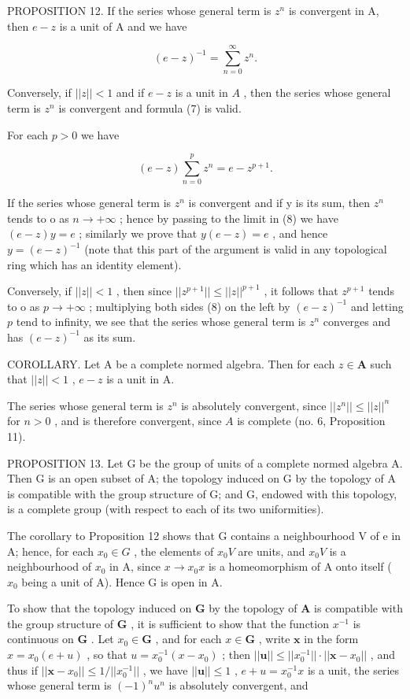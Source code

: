 PROPOSITION 12. If the series whose general term is \(z^n\) is convergent in A, then \(e - z\) is a unit of A and we have

\[
(e - z) ^ {- 1} = \sum_ {n = 0} ^ {\infty} z ^ {n}.\tag{7}
\]

Conversely, if \(||z|| < 1\) and if \(e - z\) is a unit in \(A\) , then the series whose general term is \(z^n\) is convergent and formula (7) is valid.

For each \(p > 0\) we have

\[
(e - z) \sum_ {n = 0} ^ {p} z ^ {n} = e - z ^ {p + 1}.\tag{8}
\]

If the series whose general term is \(z^{n}\) is convergent and if y is its sum, then \(z^{n}\) tends to o as \(n \to +\infty\) ; hence by passing to the limit in (8) we have \((e - z)y = e\) ; similarly we prove that \(y(e - z) = e\) , and hence \(y = (e - z)^{-1}\) (note that this part of the argument is valid in any topological ring which has an identity element).

Conversely, if \(||z|| < 1\) , then since \(||z^{p+1}|| \leqslant ||z||^{p+1}\) , it follows that \(z^{p+1}\) tends to o as \(p \to +\infty\) ; multiplying both sides (8) on the left by \((e - z)^{-1}\) and letting \(p\) tend to infinity, we see that the series whose general term is \(z^n\) converges and has \((e - z)^{-1}\) as its sum.

COROLLARY. Let A be a complete normed algebra. Then for each \(z \in \mathbf{A}\) such that \(||z|| < 1\) , \(e - z\) is a unit in A.

The series whose general term is \(z^n\) is absolutely convergent, since \(||z^n|| \leqslant ||z||^n\) for \(n > 0\) , and is therefore convergent, since \(A\) is complete (no. 6, Proposition 11).

PROPOSITION 13. Let G be the group of units of a complete normed algebra A. Then G is an open subset of A; the topology induced on G by the topology of A is compatible with the group structure of G; and G, endowed with this topology, is a complete group (with respect to each of its two uniformities).

The corollary to Proposition 12 shows that G contains a neighbourhood V of e in A; hence, for each \(x_{0} \in G\) , the elements of \(x_{0}V\) are units, and \(x_{0}V\) is a neighbourhood of \(x_{0}\) in A, since \(x \to x_{0}x\) is a homeomorphism of A onto itself ( \(x_{0}\) being a unit of A). Hence G is open in A.

To show that the topology induced on \(\mathbf{G}\) by the topology of \(\mathbf{A}\) is compatible with the group structure of \(\mathbf{G}\) , it is sufficient to show that the function \(x^{-1}\) is continuous on \(\mathbf{G}\) . Let \(x_0 \in \mathbf{G}\) , and for each \(x \in \mathbf{G}\) , write \(\boldsymbol{x}\) in the form \(x = x_0 (e + u)\) , so that \(u = x_0^{-1}(x - x_0)\) ; then \(||\boldsymbol{u}|| \leqslant ||x_0^{-1}|| \cdot ||\boldsymbol{x} - x_0||\) , and thus if \(||\boldsymbol{x} - x_0|| \leqslant 1 / ||x_0^{-1}||\) , we have \(||\boldsymbol{u}|| \leqslant 1\) , \(e + u = x_0^{-1}x\) is a unit, the series whose general term is \((-1)^n u^n\) is absolutely convergent, and

